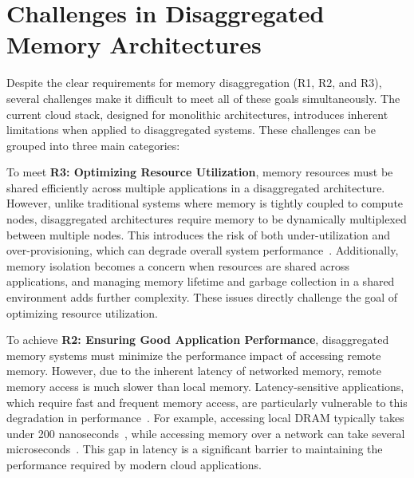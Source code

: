 \section{Challenges in Disaggregated Memory Architectures}

Despite the clear requirements for memory disaggregation (R1, R2, and R3), several challenges make it difficult to meet all of these goals simultaneously. The current cloud stack, designed for monolithic architectures, introduces inherent limitations when applied to disaggregated systems. These challenges can be grouped into three main categories:


To meet \textbf{R3: Optimizing Resource Utilization}, memory resources must be shared efficiently across multiple applications in a disaggregated architecture. However, unlike traditional systems where memory is tightly coupled to compute nodes, disaggregated architectures require memory to be dynamically multiplexed between multiple nodes. This introduces the risk of both under-utilization and over-provisioning, which can degrade overall system performance~\cite{jiffy, pocket}. Additionally, memory isolation becomes a concern when resources are shared across applications, and managing memory lifetime and garbage collection in a shared environment adds further complexity. These issues directly challenge the goal of optimizing resource utilization.


To achieve \textbf{R2: Ensuring Good Application Performance}, disaggregated memory systems must minimize the performance impact of accessing remote memory. However, due to the inherent latency of networked memory, remote memory access is much slower than local memory. Latency-sensitive applications, which require fast and frequent memory access, are particularly vulnerable to this degradation in performance~\cite{mind, chase}. For example, accessing local DRAM typically takes under 200 nanoseconds~\cite{cxl1, cxl2}, while accessing memory over a network can take several microseconds~\cite{mind,infiniswap}. This gap in latency is a significant barrier to maintaining the performance required by modern cloud applications.


